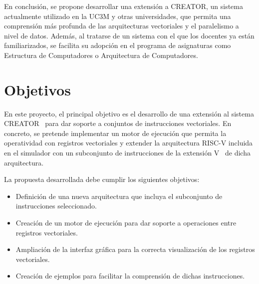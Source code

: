 En conclusión, se propone desarrollar una extensión a CREATOR, un sistema actualmente utilizado en la UC3M y otras universidades, que permita una comprensión más profunda de las arquitecturas vectoriales y el paralelismo a nivel de datos. Además, al tratarse de un sistema con el que los docentes ya están familiarizados, se facilita su adopción en el programa de asignaturas como Estructura de Computadores o Arquitectura de Computadores.

\section{Objetivos}\label{sec:objectives}
En este proyecto, el principal objetivo es el desarrollo de una extensión al sistema CREATOR~\cite{camarmas2024creator} para dar soporte a conjuntos de instrucciones vectoriales. En concreto, se pretende implementar un motor de ejecución que permita la operatividad con registros vectoriales y extender la arquitectura RISC-V incluida en el simulador con un subconjunto de instrucciones de la extensión V~\cite{vec-riscv} de dicha arquitectura.

La propuesta desarrollada debe cumplir los siguientes objetivos:
\begin{itemize}
    \item Definición de una nueva arquitectura que incluya el subconjunto de instrucciones seleccionado.
    \item Creación de un motor de ejecución para dar soporte a operaciones entre registros vectoriales.
    \item Ampliación de la interfaz gráfica para la correcta visualización de los registros vectoriales.
    \item Creación de ejemplos para facilitar la comprensión de dichas instrucciones.
\end{itemize}


